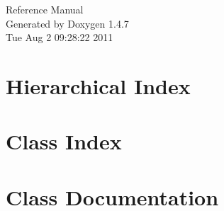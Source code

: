 \documentclass[a4paper]{book}
\begin{document}
\begin{titlepage}
\vspace*{7cm}
\begin{center}
{\Large Reference Manual}\\
\vspace*{1cm}
{\large Generated by Doxygen 1.4.7}\\
\vspace*{0.5cm}
{\small Tue Aug 2 09:28:22 2011}\\
\end{center}
\end{titlepage}
\clearemptydoublepage
{}
\tableofcontents
\clearemptydoublepage
{}
\chapter{Hierarchical Index}

\chapter{Class Index}

\chapter{Class Documentation}




























\printindex
\end{document}

